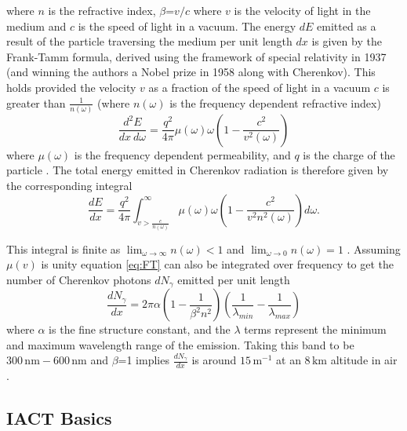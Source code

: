 where $n$ is the refractive index, $\beta$=$v/c$ where $v$ is the velocity of light in the medium and $c$ is the speed of light in a vacuum. The energy $dE$ emitted as a result of the particle traversing the medium per unit length $dx$ is given by the Frank-Tamm formula, derived using the framework of special relativity in 1937 (and winning the authors a Nobel prize in 1958 along with Cherenkov). This holds provided the velocity $v$ as a fraction of the speed of light in a vacuum $c$ is greater than $\frac{1}{n(\omega)}$ (where $n(\omega)$ is the frequency dependent refractive index)
\begin{equation}
    \frac{d^2E}{dx\ d\omega}=\frac{q^2}{4\pi}\mu(\omega)\omega\left(1- \frac{c^2}{v^2(\omega)} \right)
    \label{eq:FT}
\end{equation}
where $\mu(\omega)$ is the frequency dependent permeability, and $q$ is the charge of the particle \cite{franktamm}. The total energy emitted in Cherenkov radiation is therefore given by the corresponding integral
\begin{equation}
    \frac{dE}{dx}=\frac{q^2}{4\pi}\int_{v>\frac{c}{n(\omega)}}^{\infty}\mu(\omega)\omega \left(1- \frac{c^2}{v^2n^2(\omega)} \right) d \omega .
    \label{eq:FT2}
\end{equation}

This integral is finite as $\lim_{\omega \to \infty} n(\omega)<1$ and $\lim_{\omega \to 0} n(\omega)=1$ . Assuming $\mu(v)$ is unity equation \ref{eq:FT} can also be integrated over frequency \cite{katz} to get the number of Cherenkov photons $dN_{\gamma}$ emitted per unit length
\begin{equation}
    \frac{dN_{\gamma}}{dx}=2\pi\alpha \left( 1- \frac{1}{\beta^2n^2} \right) \left(\frac{1}{\lambda_{min}}-\frac{1}{\lambda_{max}} \right)
\end{equation}
where $\alpha$ is the fine structure constant, and the $\lambda$ terms represent the minimum and maximum wavelength range of the emission. Taking this band to be $\mathrm{300\,nm-600\,nm}$ and $\beta$=1 implies $\frac{dN_{\gamma}}{dx}$ is around $\mathrm{15\,m^{-1}}$ at an $\mathrm{8\,km}$ altitude in air \cite{katz}. 
\subsection{IACT Basics}

